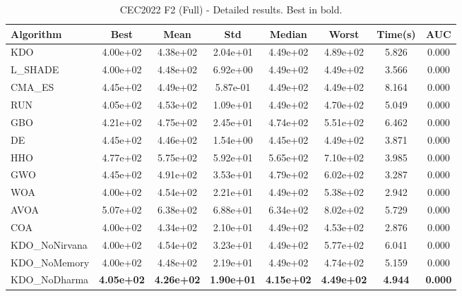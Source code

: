 \begin{table}[H]
\centering\small
\caption{CEC2022 F2 (Full) - Detailed results. Best in bold.}
\label{tab:cec2022_F2}
\begin{tabular}{lccccccc}
\toprule
\textbf{Algorithm} & \textbf{Best} & \textbf{Mean} & \textbf{Std} & \textbf{Median} & \textbf{Worst} & \textbf{Time(s)} & \textbf{AUC} \\
\midrule
KDO & 4.00e+02 & 4.38e+02 & 2.04e+01 & 4.49e+02 & 4.89e+02 & 5.826 & 0.000 \\
L_SHADE & 4.00e+02 & 4.48e+02 & 6.92e+00 & 4.49e+02 & 4.49e+02 & 3.566 & 0.000 \\
CMA_ES & 4.45e+02 & 4.49e+02 & 5.87e-01 & 4.49e+02 & 4.49e+02 & 8.164 & 0.000 \\
RUN & 4.05e+02 & 4.53e+02 & 1.09e+01 & 4.49e+02 & 4.70e+02 & 5.049 & 0.000 \\
GBO & 4.21e+02 & 4.75e+02 & 2.45e+01 & 4.74e+02 & 5.51e+02 & 6.462 & 0.000 \\
DE & 4.45e+02 & 4.46e+02 & 1.54e+00 & 4.45e+02 & 4.49e+02 & 3.871 & 0.000 \\
HHO & 4.77e+02 & 5.75e+02 & 5.92e+01 & 5.65e+02 & 7.10e+02 & 3.985 & 0.000 \\
GWO & 4.45e+02 & 4.91e+02 & 3.53e+01 & 4.79e+02 & 6.02e+02 & 3.287 & 0.000 \\
WOA & 4.00e+02 & 4.54e+02 & 2.21e+01 & 4.49e+02 & 5.38e+02 & 2.942 & 0.000 \\
AVOA & 5.07e+02 & 6.38e+02 & 6.88e+01 & 6.34e+02 & 8.02e+02 & 5.729 & 0.000 \\
COA & 4.00e+02 & 4.34e+02 & 2.10e+01 & 4.49e+02 & 4.53e+02 & 2.876 & 0.000 \\
KDO_NoNirvana & 4.00e+02 & 4.54e+02 & 3.23e+01 & 4.49e+02 & 5.77e+02 & 6.041 & 0.000 \\
KDO_NoMemory & 4.00e+02 & 4.48e+02 & 2.19e+01 & 4.49e+02 & 4.74e+02 & 5.159 & 0.000 \\
KDO_NoDharma & \textbf{4.05e+02} & \textbf{4.26e+02} & \textbf{1.90e+01} & \textbf{4.15e+02} & \textbf{4.49e+02} & \textbf{4.944} & \textbf{0.000} \\
\bottomrule
\end{tabular}
\end{table}
